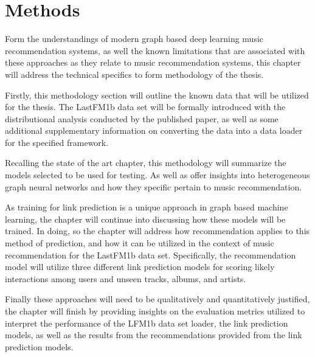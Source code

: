 \chapter{Methods}
Form the understandings of modern graph based deep learning music recommendation systems, as well the known limitations that are associated with these approaches as they relate to music recommendation systems, this chapter will address the technical specifics to form methodology of the thesis.

Firstly, this methodology section will outline the known data that will be utilized for the thesis. The LastFM1b data set will be formally introduced with the distributional analysis conducted by the published paper, as well as some additional supplementary information on converting the data into a data loader for the specified framework.

Recalling the state of the art chapter, this methodology will summarize the models selected to be used for testing. As well as offer insights into heterogeneous graph neural networks and how they specific pertain to music recommendation.

As training for link prediction is a unique approach in graph based machine learning, the chapter will continue into discussing how these models will be trained. In doing, so the chapter will address how recommendation applies to this method of prediction, and how it can be utilized in the context of music recommendation for the LastFM1b data set. Specifically, the recommendation model will utilize three different link prediction models for scoring likely interactions among users and unseen tracks, albums, and artists.

Finally these approaches will need to be qualitatively and quantitatively justified, the chapter will finish by providing insights on the evaluation metrics utilized to interpret the performance of the LFM1b data set loader, the link prediction models, as well as the results from the recommendations provided from the link prediction models. 













\newpage
